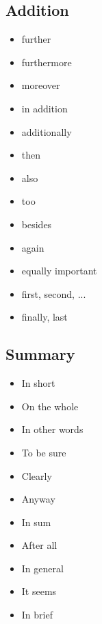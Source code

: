 \subsection{Addition}
\begin{itemize}
    \item further
    \item furthermore
    \item moreover
    \item in addition
    \item additionally
    \item then
    \item also
    \item too
    \item besides
    \item again
    \item equally important
    \item first, second, ...
    \item finally, last
\end{itemize}

\subsection{Summary}
\begin{itemize}
    \item In short
    \item On the whole
    \item In other words
    \item To be sure
    \item Clearly
    \item Anyway
    \item In sum
    \item After all
    \item In general
    \item It seems
    \item In brief
\end{itemize}




